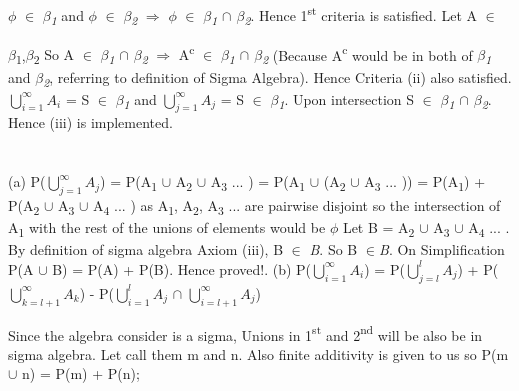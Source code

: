 \documentclass{report}
\begin{document}
	{$\phi$} {$\in$} {\textit{$\beta${\textsubscript{1}}}} and {$\phi$} {$\in$} {\textit{$\beta${\textsubscript{2}}}} {$\Rightarrow$} {$\phi$} {$\in$} {\textit{$\beta${\textsubscript{1}} $\cap$  $\beta${\textsubscript{2}}}}. Hence 1{\textsuperscript{st}} criteria is satisfied.
	Let A {$\in$} {$\beta${\textsubscript{1}},{$\beta${\textsubscript{2}} So A {$\in$} {\textit{$\beta${\textsubscript{1}} $\cap$  $\beta${\textsubscript{2}}}} {$\Rightarrow$} A{\textsuperscript{c}}} {$\in$} {\textit{$\beta${\textsubscript{1}} $\cap$  $\beta${\textsubscript{2}}}} (Because A{\textsuperscript{c}} would be in both of {\textit{$\beta${\textsubscript{1}}}} and {\textit{$\beta${\textsubscript{2}}}}, referring to definition of Sigma Algebra). Hence Criteria (ii) also satisfied.
	{$\bigcup\limits_{i=1}^{\infty} A_{i}$ = S} {$\in$} {\textit{$\beta${\textsubscript{1}}}} and {$\bigcup\limits_{j=1}^{\infty} A_{j}$ = S} {$\in$} {\textit{$\beta${\textsubscript{1}}}}. Upon intersection {S} {$\in$} {\textit{$\beta${\textsubscript{1}} $\cap$  $\beta${\textsubscript{2}}}}. Hence (iii) is implemented.
	
	\section{}
	(a) P({$\bigcup\limits_{j=1}^{\infty} A_{j}$}) = P(A{\textsubscript{1}} {$\cup$} A{\textsubscript{2}} {$\cup$} A{\textsubscript{3}} ... ) = P(A{\textsubscript{1}} {$\cup$} (A{\textsubscript{2}} {$\cup$} A{\textsubscript{3}} ... )) = P(A{\textsubscript{1}}) + P(A{\textsubscript{2}} {$\cup$} A{\textsubscript{3}} {$\cup$} A{\textsubscript{4} ... }) as A{\textsubscript{1}}, A{\textsubscript{2}}, A{\textsubscript{3}} ... are pairwise disjoint so the intersection of A{\textsubscript{1}} with the rest of the unions of elements would be {$\phi$} Let B = {A{\textsubscript{2}} {$\cup$} A{\textsubscript{3}} {$\cup$} A{\textsubscript{4}} ... }. By definition of sigma algebra Axiom (iii), B {$\in$} {\textit{B}}. So B {$\in$}{\textit{B}}. On Simplification P(A {$\cup$} B) = P(A) + P(B). Hence proved!.
	{\newline}
	(b) P({$\bigcup\limits_{i=1}^{\infty} A_{i}$}) = 
	P({$\bigcup\limits_{j=l}^{l} A_{j}$}) + P({$\bigcup\limits_{k=l+1}^{\infty} A_{k}$}) -  P({$\bigcup\limits_{i=1}^{l} A_{j}$} $\cap$ {$\bigcup\limits_{i=l+1}^{\infty} A_{j}$})
	
	Since the algebra consider is a sigma, Unions in 1{\textsuperscript{st}} and 2{\textsuperscript{nd}} will be also be in sigma algebra. Let call them m and n. Also finite additivity  is given to us so P(m {$\cup$} n) = P(m) + P(n);
	
}
\end{document}
